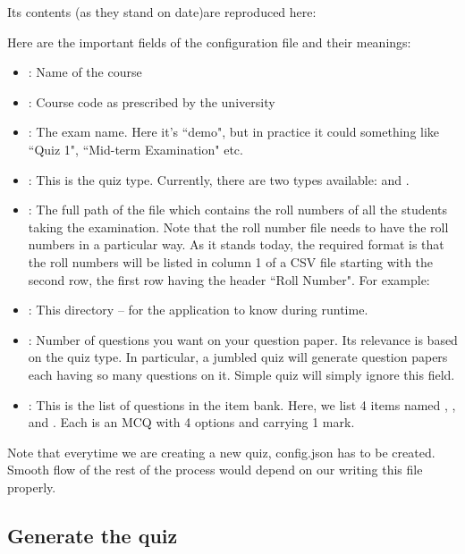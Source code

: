 \documentclass[12pt]{report}
\makeatletter
\newcommand{\kctt}[1]{{\color{Red}{\lstinline[basicstyle=\ttfamily, mathescape=true]@#1@}}}
\makeatother
\begin{document}
Its contents (as they stand on date)are reproduced here:



Here are the important fields of the configuration file and their meanings:
\begin{itemize}
\item \kctt{course name}: Name of the course
\item \kctt{course code}: Course code as prescribed by the university
\item \kctt{assessment name}: The exam name. Here it's ``demo", but in practice it could something like ``Quiz 1", ``Mid-term Examination" etc.
\item \kctt{assessment type}: This is the quiz type. Currently, there are two types available: \kctt{simple} and \kctt{jumbled}.
\item \kctt{roll number file}: The full path of the file which contains the roll numbers of all the students taking the examination. Note that the roll number file needs to have the roll numbers in a particular way. As it stands today, the required format is that the roll numbers will be listed in column 1 of a CSV file starting with the second row, the first row having the header ``Roll Number". For example:

\item \kctt{assessment home}: This directory -- for the application to know during runtime.
\item \kctt{number of items per assessment instrument}: Number of questions you want on your question paper. Its relevance is based on the quiz type. In particular, a jumbled quiz will generate question papers each having so many questions on it. Simple quiz will simply ignore this field.
\item \kctt{items}: This is the list of questions in the item bank. Here, we list 4 items named \kctt{item1}, \kctt{item2}, \kctt{item3} and \kctt{item4}. Each is an MCQ with 4 options and carrying 1 mark.  
\end{itemize}

Note that everytime we are creating a new quiz, config.json has to be created. Smooth flow of the rest of the process would depend on our writing this file properly.

\subsection{Generate the quiz}
\end{document}
